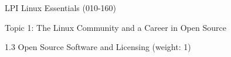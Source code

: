 LPI Linux Essentials (010-160)

Topic 1: The Linux Community and a Career in Open Source

1.3 Open Source Software and Licensing (weight: 1)

